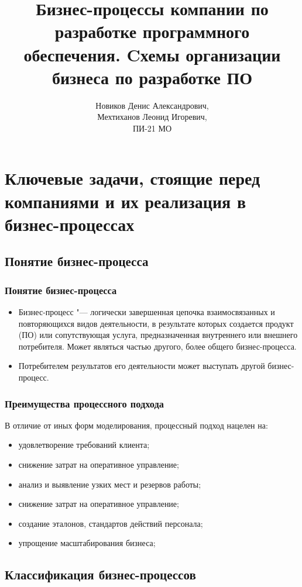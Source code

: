 \documentclass{../industrial-development}
\title{Бизнес-процессы компании по разработке программного обеспечения.
	Cхемы организации бизнеса по разработке ПО}
\author{Новиков Денис Александрович, \\Мехтиханов Леонид Игоревич, \\ПИ-21 МО}
\date{}
\begin{document}
\begin{frame}
  \titlepage
\end{frame}


\section{Ключевые задачи, стоящие перед компаниями и их реализация в бизнес-процессах}

\subsection{Понятие бизнес-процесса}


\begin{frame} \frametitle{Понятие бизнес-процесса}
	\begin{itemize}
		\item \alert{Бизнес-процесс} "--- логически завершенная цепочка взаимосвязанных и повторяющихся видов деятельности, в результате которых создается продукт (ПО) или сопутствующая услуга, предназначенная внутреннего или внешнего потребителя. Может являться частью другого, более общего бизнес-процесса.
		\item Потребителем результатов его деятельности может выступать другой бизнес-процесс.
	\end{itemize}
\end{frame}
\lecturenotes


\begin{frame} \frametitle{Преимущества процессного подхода}
	В отличие от иных форм моделирования, процессный подход нацелен на:
	\begin{itemize}
		\item удовлетворение требований клиента;
		\item снижение затрат на оперативное управление;
		\item анализ и выявление узких мест и резервов работы;
		\item снижение затрат на оперативное управление;
		\item создание эталонов, стандартов действий персонала;
		\item упрощение масштабирования бизнеса;
	\end{itemize}
\end{frame}
\lecturenotes


\subsection{Классификация бизнес-процессов}
\end{document}
